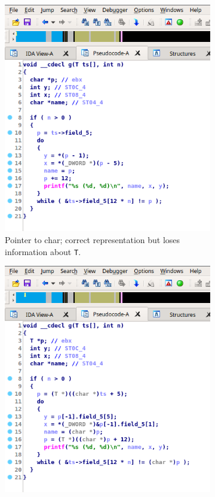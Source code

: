 \begin{figure}[htbp]
	\centering
	\begin{subfigure}[ht]{0.45\textwidth}
		\centering
		\includegraphics[width=\textwidth]{inc/ida_struct_1.png}
		\caption{Pointer to char; correct representation but loses information about \texttt{T}.}
		\label{fig:ida_struct_1}
	\end{subfigure}
	\qquad
	\begin{subfigure}[ht]{0.45\textwidth}
		\centering
		\includegraphics[width=\textwidth]{inc/ida_struct_2.png}

\end{subfigure}
\end{figure}

